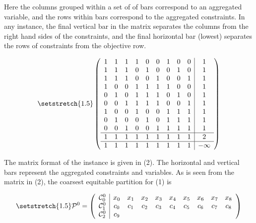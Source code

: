 \documentclass[11pt]{article} %
\newcommand{\cC}{{\cal C}}
\begin{document}
	Here the columns grouped within a set of of bars correspond to an aggregated variable, and the rows within bars correspond to the aggregated constraints.  In any instance, the final vertical bar in the matrix separates the columns from the right hand sides of the constraints, and the final horizontal bar (lowest) separates the rows of constraints from the objective row.
	
\begin{equation}\setstretch{1.5}
 	\begin{pmatrix}
 		\begin{array}{ccccccccc|c}
 			1 & 1 & 1 & 1 & 0 & 0 & 1 & 0 & 0 & 1 \\ 
 			1 & 1 & 1 & 0 & 1 & 0 & 0 & 1 & 0 &  1 \\ 
 			1 & 1 & 1 & 0 & 0 & 1 & 0 & 0 & 1 & 1 \\ 
 			1 & 0 & 0 & 1 & 1 & 1 & 1 & 0 & 0 & 1 \\ 
 			0 & 1 & 0 & 1 & 1 & 1 & 0 & 1 & 0 & 1 \\ 
 			0 & 0 & 1 & 1 & 1 & 1 & 0 & 0 & 1 & 1 \\ 
 			1 & 0 & 0 & 1 & 0 & 0 & 1 & 1 & 1 & 1 \\ 
 			0 & 1 & 0 & 0 & 1 & 0 & 1 & 1 & 1 & 1 \\ 
 			0 & 0 & 1 & 0 & 0 & 1 & 1 & 1 & 1 & 1 \\ 
 			\hline
 			1 & 1 & 1 & 1 & 1 & 1 & 1 & 1 & 1 & 2 \\ 
 			\hline
 			1 & 1 & 1 & 1 & 1 & 1 & 1 & 1 & 1 & -\infty
 		\end{array}
 	\end{pmatrix}
 \end{equation}
 
	 The matrix format of the instance is given in (2).  The horizontal and vertical bars represent the aggregated constraints and variables. As is seen from the matrix in (2), the coarsest equitable partition for (1) is
	 
	 \begin{equation}\setstretch{1.5}
	 	\mathcal{P}^0 = 
	 	\begin{pmatrix} 
	 	\begin{array}{c|ccccccccc}
	 	\cC_0^0 & x_0 & x_1 & x_2 & x_3 & x_4 & x_5 & x_6 & x_7 & x_8 \\
	 	\cC_1^0 & c_0 & c_1 & c_2 & c_3 & c_4 & c_5 & c_6 & c_7 & c_8 \\
	 	\cC_2^0 & c_9
	 	\end{array}
	 	\end{pmatrix} 
	 \end{equation}
	 
\end{document}
